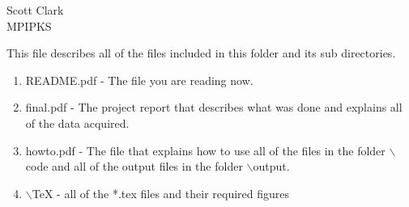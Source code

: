\documentclass[12pt]{article}
\begin{document}
\begin{flushleft}
Scott Clark \\
MPIPKS
\end{flushleft}

This file describes all of the files included in this folder and its sub directories.

\begin{enumerate}
	\item{README.pdf - The file you are reading now.}
	\item{final.pdf - The project report that describes what was done and explains all of the data acquired.}
	\item{howto.pdf - The file that explains how to use all of the files in the folder $\backslash$code and all of the output files in the folder $\backslash$output.}
	\item{$\backslash$TeX - all of the *.tex files and their required figures}
\end{enumerate}
\end{document}
